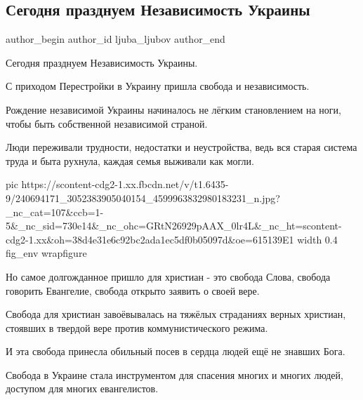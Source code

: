  
 
 
 
 
 
\subsection{Сегодня  празднуем Независимость Украины}
\label{sec:24_08_2021.fb.ljuba_ljubov.1.nezalezhnist_svoboda_hristiane}
 
\ifcmt
 author_begin
   author_id ljuba_ljubov
 author_end
\fi

Сегодня  празднуем Независимость Украины.

С приходом Перестройки в Украину пришла свобода и независимость.

Рождение независимой Украины начиналось не лёгким становлением на ноги, чтобы
быть собственной независимой страной.

Люди переживали трудности, недостатки и неустройства, ведь вся старая система
труда и быта рухнула, каждая семья выживали как могли.

\ifcmt
  pic https://scontent-cdg2-1.xx.fbcdn.net/v/t1.6435-9/240694171_3052383905040154_4599963832980183231_n.jpg?_nc_cat=107&ccb=1-5&_nc_sid=730e14&_nc_ohc=GRtN26929pAAX_0lr4L&_nc_ht=scontent-cdg2-1.xx&oh=38d4e31e6c92bc2ada1ec5df0b05097d&oe=615139E1
  width 0.4
	fig_env wrapfigure
\fi

Но самое долгожданное пришло для христиан - это свобода Слова, свобода говорить
Евангелие, свобода открыто заявить о своей вере.

Свобода для христиан завоёвывалась на тяжёлых страданиях верных христиан,
стоявших в твердой вере против коммунистического режима.

И эта свобода принесла обильный посев в сердца людей ещё не знавших Бога.

Свобода в Украине стала инструментом для спасения многих и многих людей,
доступом для многих евангелистов.

